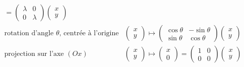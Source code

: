 \documentclass[10pt,class=article,crop=false]{standalone}
\begin{document}
\begin{multicols}{2}
\[\begin{array}{ll}
= 
\begin{pmatrix} \lambda & 0 \\ 0 & \lambda \end{pmatrix} \begin{pmatrix} x \\ y \end{pmatrix}
\\[2em]
\text{rotation d'angle $\theta$, centrée à l'origine} &
\begin{pmatrix} x \\ y \end{pmatrix} 
\mapsto 
\begin{pmatrix} \cos\theta & -\sin\theta\\ \sin\theta & \cos\theta \end{pmatrix} \begin{pmatrix} x \\ y \end{pmatrix}
\\[2em]
\text{projection sur l'axe $(Ox)$} &
\begin{pmatrix} x \\ y \end{pmatrix} \mapsto \begin{pmatrix} x \\ 0 \end{pmatrix}
= \begin{pmatrix} 1 & 0 \\ 0 & 0 \end{pmatrix} \begin{pmatrix} x \\ y \end{pmatrix}
\end{array}
\]

\medskip


\end{multicols}
\end{document}
